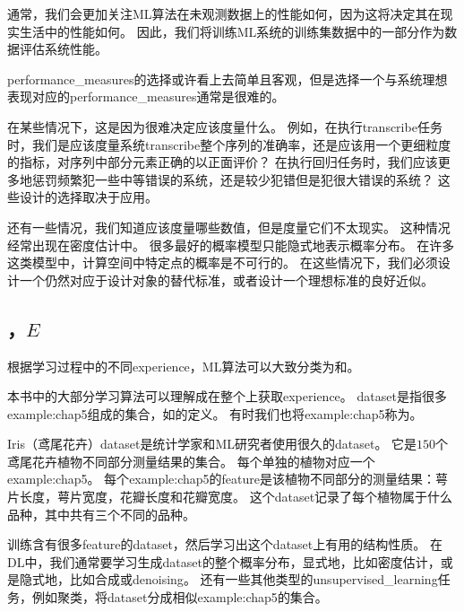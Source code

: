 
通常，我们会更加关注\gls{ML}算法在未观测数据上的性能如何，因为这将决定其在现实生活中的性能如何。
因此，我们将训练\gls{ML}系统的训练集数据中的一部分作为数据评估系统性能。

\gls{performance_measures}的选择或许看上去简单且客观，但是选择一个与系统理想表现对应的\gls{performance_measures}通常是很难的。

在某些情况下，这是因为很难决定应该度量什么。
例如，在执行\gls{transcribe}任务时，我们是应该度量系统\gls{transcribe}整个序列的准确率，还是应该用一个更细粒度的指标，对序列中部分元素正确的以正面评价？
在执行回归任务时，我们应该更多地惩罚频繁犯一些中等错误的系统，还是较少犯错但是犯很大错误的系统？
这些设计的选择取决于应用。

还有一些情况，我们知道应该度量哪些数值，但是度量它们不太现实。
这种情况经常出现在密度估计中。
很多最好的概率模型只能隐式地表示概率分布。
在许多这类模型中，计算空间中特定点的概率是不可行的。
在这些情况下，我们必须设计一个仍然对应于设计对象的替代标准，或者设计一个理想标准的良好近似。

\subsection{，$E$}
\label{sec:the_experience_e}
根据学习过程中的不同\gls{experience}，\gls{ML}算法可以大致分类为和。

本书中的大部分学习算法可以理解成在整个上获取\gls{experience}。
\gls{dataset}是指很多\gls{example:chap5}组成的集合，如的定义。
有时我们也将\gls{example:chap5}称为。


Iris（鸢尾花卉）\gls{dataset}\citep{Fisher-1936}是统计学家和\gls{ML}研究者使用很久的\gls{dataset}。
它是$150$个鸢尾花卉植物不同部分测量结果的集合。
每个单独的植物对应一个\gls{example:chap5}。
每个\gls{example:chap5}的\gls{feature}是该植物不同部分的测量结果：萼片长度，萼片宽度，花瓣长度和花瓣宽度。
这个\gls{dataset}记录了每个植物属于什么品种，其中共有三个不同的品种。

训练含有很多\gls{feature}的\gls{dataset}，然后学习出这个\gls{dataset}上有用的结构性质。
在\gls{DL}中，我们通常要学习生成\gls{dataset}的整个概率分布，显式地，比如密度估计，或是隐式地，比如合成或\gls{denoising}。
还有一些其他类型的\gls{unsupervised_learning}任务，例如聚类，将\gls{dataset}分成相似\gls{example:chap5}的集合。

